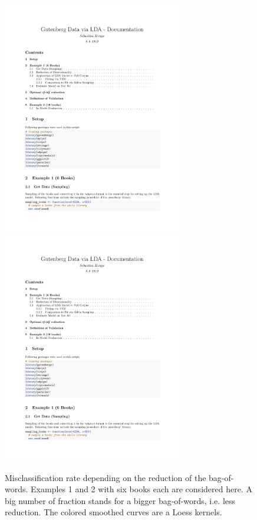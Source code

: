\documentclass[11pt,a4paper]{article}
\begin{document}
\begin{figure}[h]
	\centering
	\includegraphics[page=14, trim=73 405 60 70,clip,width=0.7\textwidth]{LDA_Documentation.pdf}
	\includegraphics[page=16, trim=85 275 50 200,clip,width=0.7\textwidth]{LDA_Documentation.pdf}

	\caption{Misclassification rate depending on the reduction of the bag-of-words. Examples 1 and 2 with six books each are considered here. A big number of fraction stands for a bigger bag-of-words, i.e. less reduction. The colored smoothed curves are a Loess kernels.}
	\label{misc.rate_tfidf}
\end{figure}
\end{document}
